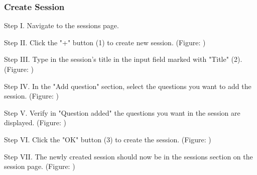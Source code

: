 \subsubsection{Create Session}
\begin{userManualItemlist}
	\item[Step I.] Navigate to the sessions page.
	\item[Step II.] Click the "+" button (1) to create new session. (Figure: )
	\item[Step III.] Type in the session's title in the input field marked with "Title" (2). (Figure: )
	\item[Step IV.] In the "Add question" section, select the questions you want to add the session. (Figure: )
	\item[Step V.] Verify in "Question added" the questions you want in the session are displayed. (Figure: )
	\item[Step VI.] Click the "OK" button (3) to create the session. (Figure: )
	\item[Step VII.] The newly created session should now be in the sessions section on the session page. (Figure: )
\end{userManualItemlist}